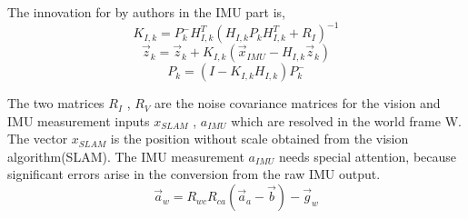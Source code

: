 The innovation for by authors in the IMU part is,
\begin{equation}
K_{I,k}=P_k^- H_{I,k}^T (H_{I,k} P_k H_{I,k}^T +R_I)^{-1}
\end{equation}
\begin{equation}
\overrightarrow{z}_{k}=\overrightarrow{z}_{k}+K_{I,k}(\overrightarrow{x}_{IMU}-H_{I,k} \overrightarrow{z}_{k})
\end{equation}
\begin{equation}
P_k=(I-K_{I,k} H_{I,k}) P_k^-
\end{equation}

The two matrices $R_I$ , $R_V$ are the noise covariance matrices for the vision and IMU measurement inputs $x_{SLAM}$ , $a_{IMU}$ which are resolved in the world frame W.
The vector $x_{SLAM}$ is the position without scale obtained from the vision algorithm(SLAM). The IMU measurement $a_{IMU}$ needs special attention, because significant errors arise in the conversion from the raw IMU output.
\begin{equation}
\overrightarrow{a}_{w}=R_{wc}R_{ca} (\overrightarrow{a}_a - \overrightarrow{b})-\overrightarrow{g}_w
\end{equation}


